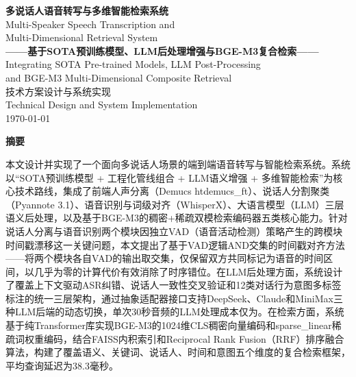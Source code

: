 \documentclass[12pt, a4paper]{article}
\begin{document}
\begin{titlepage}
\begin{center}
\vspace*{1.5in}

{\LARGE \textbf{多说话人语音转写与多维智能检索系统}} \\[0.35in]
{\large Multi-Speaker Speech Transcription and} \\
{\large Multi-Dimensional Retrieval System} \\[0.55in]

{\large \textbf{——基于SOTA预训练模型、LLM后处理增强与BGE-M3复合检索——}} \\[0.35in]
{\normalsize Integrating SOTA Pre-trained Models, LLM Post-Processing} \\
{\normalsize and BGE-M3 Multi-Dimensional Composite Retrieval} \\[0.8in]

{\large 技术方案设计与系统实现} \\[0.2in]
{\normalsize Technical Design and System Implementation} \\[0.7in]

{\normalsize \today}

\end{center}
\end{titlepage}

\begin{center}
\textbf{\large 摘\quad 要}
\end{center}

\noindent
本文设计并实现了一个面向多说话人场景的端到端语音转写与智能检索系统。系统以``SOTA预训练模型 + 工程化管线组合 + LLM语义增强 + 多维智能检索''为核心技术路线，集成了前端人声分离（Demucs htdemucs\_ft）、说话人分割聚类（Pyannote 3.1）、语音识别与词级对齐（WhisperX）、大语言模型（LLM）三层语义后处理，以及基于BGE-M3的稠密+稀疏双模检索编码器五类核心能力。针对说话人分离与语音识别两个模块因独立VAD（语音活动检测）策略产生的跨模块时间戳漂移这一关键问题，本文提出了基于VAD逻辑AND交集的时间戳对齐方法——将两个模块各自VAD的输出取交集，仅保留双方共同标记为语音的时间区间，以几乎为零的计算代价有效消除了时序错位。在LLM后处理方面，系统设计了覆盖上下文驱动ASR纠错、说话人一致性交叉验证和12类对话行为意图多标签标注的统一三层架构，通过抽象适配器接口支持DeepSeek、Claude和MiniMax三种LLM后端的动态切换，单次30秒音频的LLM处理成本仅为。在检索方面，系统基于纯Transformer库实现BGE-M3的1024维CLS稠密向量编码和sparse\_linear稀疏词权重编码，结合FAISS内积索引和Reciprocal Rank Fusion（RRF）排序融合算法，构建了覆盖语义、关键词、说话人、时间和意图五个维度的复合检索框架，平均查询延迟为38.3毫秒。
\end{document}
